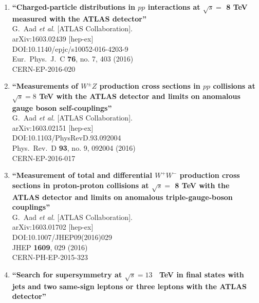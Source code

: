 \documentclass{article}
\begin{document}
\begin{enumerate}
\item%
{\bf ``Charged-particle distributions in $pp$ interactions at $\sqrt{s}=$ 8 TeV measured with the ATLAS detector''}
  \\{}G.~Aad {\it et al.} [ATLAS Collaboration].
  \\{}arXiv:1603.02439 [hep-ex]
  \\{}DOI:10.1140/epjc/s10052-016-4203-9
  \\{}Eur.\ Phys.\ J.\ C {\bf 76}, no. 7, 403 (2016)
  \\{}CERN-EP-2016-020
\item%
{\bf ``Measurements of $W^\pm Z$ production cross sections in $pp$ collisions at $\sqrt{s} = 8$ TeV with the ATLAS detector and limits on anomalous gauge boson self-couplings''}
  \\{}G.~Aad {\it et al.} [ATLAS Collaboration].
  \\{}arXiv:1603.02151 [hep-ex]
  \\{}DOI:10.1103/PhysRevD.93.092004
  \\{}Phys.\ Rev.\ D {\bf 93}, no. 9, 092004 (2016)
  \\{}CERN-EP-2016-017
\item%
{\bf ``Measurement of total and differential $W^+W^-$ production cross sections in proton-proton collisions at $\sqrt{s}=$ 8 TeV with the ATLAS detector and limits on anomalous triple-gauge-boson couplings''}
  \\{}G.~Aad {\it et al.} [ATLAS Collaboration].
  \\{}arXiv:1603.01702 [hep-ex]
  \\{}DOI:10.1007/JHEP09(2016)029
  \\{}JHEP {\bf 1609}, 029 (2016)
  \\{}CERN-PH-EP-2015-323
\item%
{\bf ``Search for supersymmetry at $\sqrt{s}=13$  TeV in final states with jets and two same-sign leptons or three leptons with the ATLAS detector''}

\end{enumerate}
\end{document}
